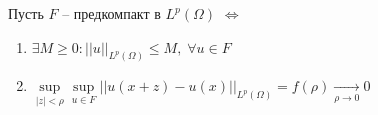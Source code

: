 \begin{theorem}[Рисс]
  Пусть $F$ -- предкомпакт в $L^p(\Omega)$
  $\Longleftrightarrow$ \begin{minipage}[t]{0.8\linewidth}\begin{enumerate}[itemsep=1mm]
      \item $\exists M \ge 0: ||u||_{L^p(\Omega)} \le M, \; \forall u \in F$
      \item $\sup\limits_{|z| < \rho}\sup\limits_{u \in F} ||u(x+z)-u(x)||_{L^p(\Omega)} = f(\rho) \underset{\rho \rightarrow 0}{\longrightarrow} 0$
  \end{enumerate}\end{minipage}
      
\end{theorem}
